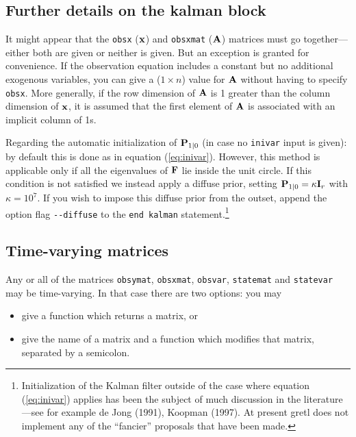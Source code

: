 \documentclass[a4paper]{article}
\newcommand{\obsx}{\ensuremath\mathbf{x}}
\newcommand{\obsxmat}{\ensuremath\mathbf{A}}
\newcommand{\statemat}{\ensuremath\mathbf{F}}
\newcommand{\statevar}{\ensuremath\mathbf{P}}
\begin{document}
\subsection{Further details on the kalman block}

It might appear that the \texttt{obsx} ($\obsx$) and \texttt{obsxmat}
($\obsxmat$) matrices must go together---either both are given or
neither is given.  But an exception is granted for convenience.  If
the observation equation includes a constant but no additional
exogenous variables, you can give a ($1 \times n$) value for
$\obsxmat$ without having to specify \texttt{obsx}.  More generally,
if the row dimension of $\obsxmat$ is 1 greater than the column
dimension of $\obsx$, it is assumed that the first element of
$\obsxmat$ is associated with an implicit column of 1s.

Regarding the automatic initialization of $\statevar_{1|0}$ (in case
no \texttt{inivar} input is given): by default this is done as in
equation (\ref{eq:inivar}).  However, this method is applicable only
if all the eigenvalues of $\statemat$ lie inside the unit circle.  If
this condition is not satisfied we instead apply a diffuse prior,
setting $\statevar_{1|0} = \kappa \mathbf{I}_r$ with $\kappa = 10^7$.
If you wish to impose this diffuse prior from the outset, append the
option flag \verb|--diffuse| to the \texttt{end kalman}
statement.\footnote{ Initialization of the Kalman filter outside of
  the case where equation (\ref{eq:inivar}) applies has been the
  subject of much discussion in the literature---see for example de
  Jong (1991), Koopman (1997).  At present gretl does not implement
  any of the ``fancier'' proposals that have been made.}

\subsection{Time-varying matrices}

Any or all of the matrices \texttt{obsymat}, \texttt{obsxmat},
\texttt{obsvar}, \texttt{statemat} and \texttt{statevar} may be
time-varying.  In that case there are two options: you may

\begin{itemize}
\item give a function which returns a matrix, or
\item give the name of a matrix and a function which modifies that
  matrix, separated by a semicolon.
\end{itemize}
\end{document}
